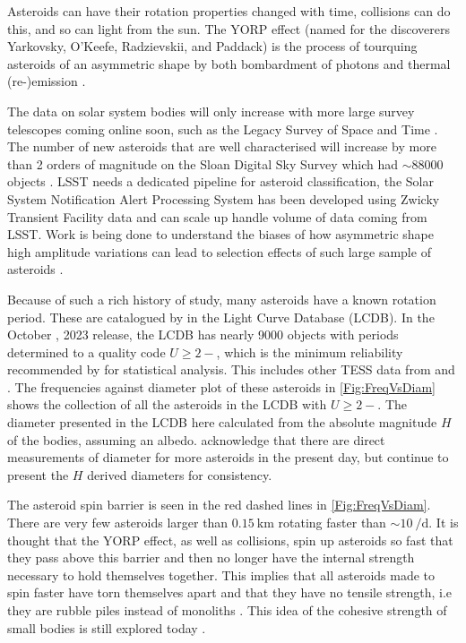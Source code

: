 \documentclass{UCreport}
\begin{document}
Asteroids can have their rotation properties changed with time, collisions can do this, and so can light from the sun.
The YORP effect (named for the discoverers Yarkovsky, O'Keefe, Radzievskii, and Paddack) is the process of tourquing asteroids of an asymmetric shape by both bombardment of photons and thermal (re-)emission \citep{Rubincam2000}.

The data on solar system bodies will only increase with more large survey telescopes coming online soon, such as the Legacy Survey of Space and Time \citep[LSST][]{LSST2019}.
The number of new asteroids that are well characterised will increase by more than 2 orders of magnitude on the Sloan Digital Sky Survey \citep[SDSS][]{York2000} which had $\sim 88000$ objects \citet{Parker2008}.
LSST needs a dedicated pipeline for asteroid classification, the Solar System Notification Alert Processing System \citep[SNAPS][]{Trilling2023} has been developed using Zwicky Transient Facility \citep[ZTF, ][]{Bellm2018} data and can scale up handle volume of data coming from LSST.
Work is being done to understand the biases of how  asymmetric shape high amplitude variations can lead to selection effects of such large sample of asteroids \citet{Levine2023}.

Because of such a rich history of study, many asteroids have a known rotation period.
These are catalogued by \citet{Warner2009} in the Light Curve Database (LCDB).
In the October , 2023 release, the LCDB has nearly 9000 objects with periods determined to a quality code $U\geq 2-$, which is the minimum reliability recommended by \citeauthor{Warner2009} for statistical analysis.
This includes other TESS data from \citet{Pal2020} and \citet{Woods2021}.
The frequencies against diameter plot of these asteroids in \autoref{Fig:FreqVsDiam} shows the collection of all the asteroids in the LCDB with $U\geq 2-$.
The diameter presented in the LCDB here calculated from the absolute magnitude $H$ of the bodies, assuming an albedo.
\citeauthor{Warner2009} acknowledge that there are direct measurements of diameter for more asteroids in the present day, but continue to present the $H$ derived diameters for consistency.

The asteroid spin barrier \citep{Pravec2000} is seen in the red dashed lines in \autoref{Fig:FreqVsDiam}.
There are very few asteroids larger than $\qty{0.15}{\kilo\metre}$ rotating faster than $\sim \qty{10}{\per\day}$.
It is thought that the YORP effect, as well as collisions, spin up asteroids so fast that they pass above this barrier and then no longer have the internal strength necessary to hold themselves together.
This implies that all asteroids made to spin faster have torn themselves apart and that they have no tensile strength, i.e they are rubble piles instead of monoliths \citep{Harris1996}.
This idea of the cohesive strength of small bodies is still explored today \citep[e.g.][for V-type asteroids]{Oszkiewicz2020}.
\end{document}
